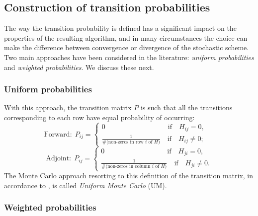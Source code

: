 \documentclass[final,leqno,onefignum,onetabnum]{siamltex1213}
\begin{document}
\subsection{Construction of transition probabilities}

The way the transition probability is defined has a significant impact
on the properties of the resulting algorithm, and in many circumstances the
choice can make the difference between convergence or divergence of the stochastic
scheme.  Two main approaches have been considered in the literature:
\textit{uniform probabilities} and \textit{weighted probabilities}.
We discuss these next.

\subsubsection{Uniform probabilities}

With this approach, the transition matrix $P$ is such that all the 
transitions corresponding to each row have equal probability of occurring:
\[
\text{Forward}:\;P_{ij}=
\begin{cases}
0 \quad \quad \quad \qquad \qquad \qquad \text{if}\quad H_{ij}=0, \\
\frac{1}{\#(\text{non-zeros in row $i$ of $H$)}} \quad \text{if} \quad H_{ij}\ne 0;
\end{cases}\quad
\]
\[
\text{Adjoint}:\;P_{ij}=
\begin{cases}
0 \quad \quad \quad \qquad \qquad \qquad \text{if}\quad H_{ji}=0, \\
\frac{1}{\#(\text{non-zeros in column $i$ of $H$)}} \quad \text{if} \quad H_{ji}\ne 0.
\end{cases}
\]
The Monte Carlo approach resorting to this definition of the transition matrix,
in accordance to \cite{AADBTW2005}, is called \textit{Uniform Monte Carlo} (UM).

\subsubsection{Weighted probabilities}
\end{document}
